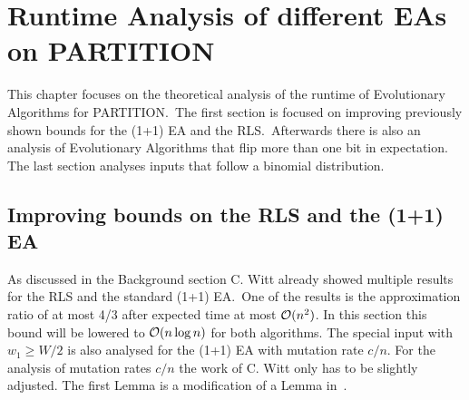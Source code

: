 \chapter{Runtime Analysis of different EAs on PARTITION}\label{ch:Content1}

This chapter focuses on the theoretical analysis of the runtime of Evolutionary Algorithms for PARTITION.\
The first section is focused on improving previously shown bounds for the (1+1) EA and the RLS.\
Afterwards there is also an analysis of Evolutionary Algorithms that flip more than one bit in expectation.
The last section analyses inputs that follow a binomial distribution.

\section{Improving bounds on the RLS and the (1+1) EA}
As discussed in the Background section C. Witt already showed multiple results for the RLS and the standard (1+1) EA.\
One of the results is the approximation ratio of at most 4/3 after expected time at most $\mathcal{O}(n^2)$.
In this section this bound will be lowered to $\mathcal{O}(n\log{n})$ for both algorithms.
The special input with $w_1\ge W/2$ is also analysed for the (1+1) EA with mutation rate $c/n$.
For the analysis of mutation rates $c/n$ the work of C. Witt only has to be slightly adjusted.
The first Lemma is a modification of a Lemma in~\cite{witt2005worst}.

